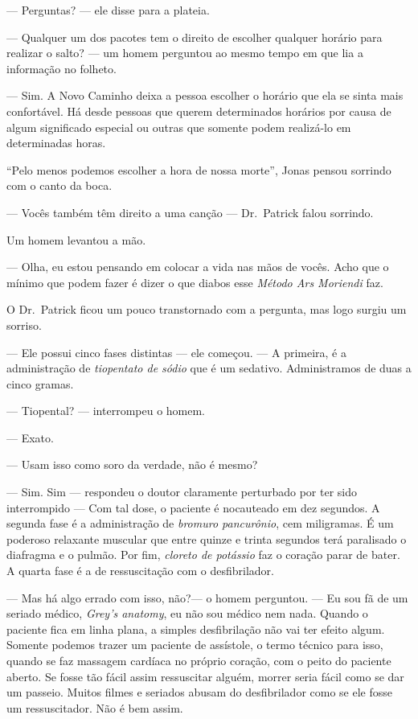 --- Perguntas? --- ele disse para a plateia.

--- Qualquer um dos pacotes tem o direito de escolher qualquer horário para realizar o salto? --- um homem perguntou ao mesmo tempo em que lia a informação no folheto.

--- Sim. A Novo Caminho deixa a pessoa escolher o horário que ela se sinta mais confortável. Há desde pessoas que querem determinados horários por causa de algum significado especial ou outras que somente podem realizá-lo em determinadas horas.

``Pelo menos podemos escolher a hora de nossa morte'', Jonas pensou\mudanca{,} sorrindo com o canto da boca.

--- Vocês também têm direito a uma canção --- Dr.~Patrick falou\mudanca{,} sorrindo.

Um homem levantou a mão.

--- Olha, eu estou pensando em colocar a vida nas mãos de vocês. Acho que o mínimo que podem fazer é dizer o que diabos esse \emph{Método Ars Moriendi} faz.

O Dr.~Patrick ficou um pouco transtornado com a pergunta, mas logo surgiu um sorriso.

--- Ele possui cinco fases distintas --- ele começou. --- A primeira, é a administração de \emph{tiopentato de sódio} que é um sedativo. Administramos de duas a cinco gramas.

--- Tiopental? --- interrompeu o homem.

--- Exato.

--- Usam isso como soro da verdade, não é mesmo?

--- Sim. Sim --- respondeu o doutor claramente perturbado por ter sido interrompido --- Com tal dose, o paciente é nocauteado em dez segundos. A segunda fase é a administração de \emph{bromuro pancurônio}, cem miligramas. É um poderoso relaxante muscular que entre quinze e trinta segundos terá paralisado o diafragma e o pulmão. Por fim, \emph{cloreto de potássio} faz o coração parar de bater. A quarta fase é a de ressuscitação com o desfibrilador.

--- Mas há algo errado com isso, não?--- o homem perguntou. --- Eu sou fã de um seriado médico, \emph{Grey's anatomy}, eu não sou médico nem nada. Quando o paciente fica em linha plana, a simples desfibrilação não vai ter efeito algum. Somente podemos trazer um paciente de assístole, o termo técnico para isso, quando se faz massagem cardíaca no próprio coração, com o peito do paciente aberto. Se fosse tão fácil assim ressuscitar alguém, morrer seria fácil como se dar um passeio. Muitos filmes e seriados abusam do desfibrilador como se ele fosse um ressuscitador. Não é bem assim.

